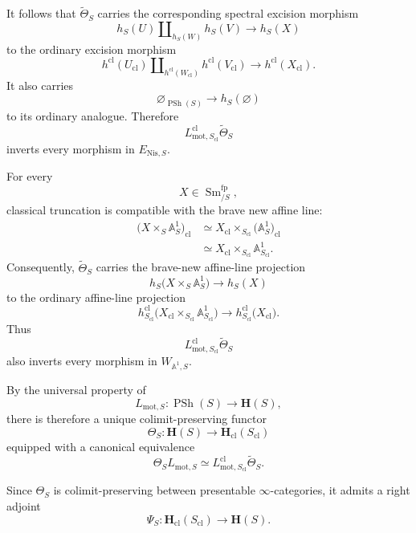 \begin{construction}
It follows that \(\widetilde\Theta_S\) carries the corresponding
spectral excision morphism
\[
    h_S(U)
    \amalg_{h_S(W)}
    h_S(V)
    \longrightarrow
    h_S(X)
\]
to the ordinary excision morphism
\[
    h^{\mathrm{cl}}(U_{\mathrm{cl}})
    \amalg_{h^{\mathrm{cl}}(W_{\mathrm{cl}})}
    h^{\mathrm{cl}}(V_{\mathrm{cl}})
    \longrightarrow
    h^{\mathrm{cl}}(X_{\mathrm{cl}}).
\]
It also carries
\[
    \varnothing_{\operatorname{PSh}(S)}
    \longrightarrow
    h_S(\varnothing)
\]
to its ordinary analogue.  Therefore
\[
    L^{\mathrm{cl}}_{\mathrm{mot},S_{\mathrm{cl}}}
    \widetilde\Theta_S
\]
inverts every morphism in \(E_{\mathrm{Nis},S}\).

For every
\[
    X
    \in
    \operatorname{Sm}^{\mathrm{fp}}_{/S},
\]
classical truncation is compatible with the brave new affine line:
\[
\begin{aligned}
    \bigl(
        X\times_S\mathbb A^1_S
    \bigr)_{\mathrm{cl}}
    &\simeq
    X_{\mathrm{cl}}
    \times_{S_{\mathrm{cl}}}
    \bigl(
        \mathbb A^1_S
    \bigr)_{\mathrm{cl}}
    \\
    &\simeq
    X_{\mathrm{cl}}
    \times_{S_{\mathrm{cl}}}
    \mathbb A^1_{S_{\mathrm{cl}}}.
\end{aligned}
\]
Consequently, \(\widetilde\Theta_S\) carries the brave-new
affine-line projection
\[
    h_S
    \bigl(
        X\times_S\mathbb A^1_S
    \bigr)
    \longrightarrow
    h_S(X)
\]
to the ordinary affine-line projection
\[
    h^{\mathrm{cl}}_{S_{\mathrm{cl}}}
    \bigl(
        X_{\mathrm{cl}}
        \times_{S_{\mathrm{cl}}}
        \mathbb A^1_{S_{\mathrm{cl}}}
    \bigr)
    \longrightarrow
    h^{\mathrm{cl}}_{S_{\mathrm{cl}}}
    \bigl(
        X_{\mathrm{cl}}
    \bigr).
\]
Thus
\[
    L^{\mathrm{cl}}_{\mathrm{mot},S_{\mathrm{cl}}}
    \widetilde\Theta_S
\]
also inverts every morphism in \(W_{\mathbb A^1,S}\).

By the universal property of
\[
    L_{\mathrm{mot},S}
    \colon
    \operatorname{PSh}(S)
    \longrightarrow
    \mathbf H(S),
\]
there is therefore a unique colimit-preserving functor
\[
    \Theta_S
    \colon
    \mathbf H(S)
    \longrightarrow
    \mathbf H_{\mathrm{cl}}(S_{\mathrm{cl}})
\]
equipped with a canonical equivalence
\[
    \Theta_SL_{\mathrm{mot},S}
    \simeq
    L^{\mathrm{cl}}_{\mathrm{mot},S_{\mathrm{cl}}}
    \widetilde\Theta_S.
\]

Since \(\Theta_S\) is colimit-preserving between presentable
\(\infty\)-categories, it admits a right adjoint
\[
    \Psi_S
    \colon
    \mathbf H_{\mathrm{cl}}(S_{\mathrm{cl}})
    \longrightarrow
    \mathbf H(S).
\]


\end{construction}
